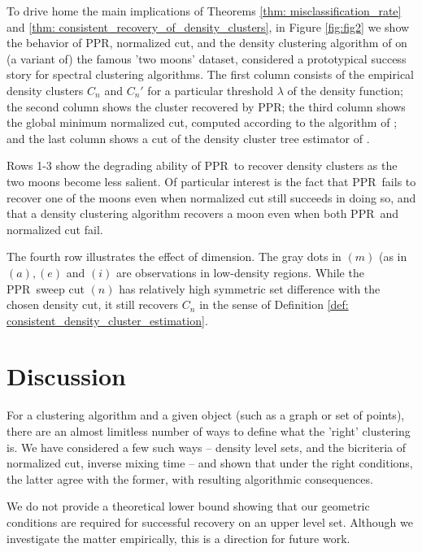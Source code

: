 \documentclass{article}
\newcommand{\1}{\mathbf{1}}
\newcommand{\ppr}{{\sc PPR}}
\newcommand{\pprspace}{{\sc PPR~}}
\theoremstyle{aldenthm}
\theoremstyle{aldenrmrk}
\begin{document}
To drive home the main implications of Theorems \ref{thm: misclassification_rate} and \ref{thm: consistent_recovery_of_density_clusters}, in Figure \ref{fig:fig2} we show the behavior of \ppr, normalized cut, and the density clustering algorithm of \citep{chaudhuri2010} on (a variant of) the famous 'two moons' dataset, considered a prototypical success story for spectral clustering algorithms. The first column consists of the empirical density clusters $C_n$ and $C_n'$ for a particular threshold $\lambda$ of the density function; the second column shows the cluster recovered by \ppr; the third column shows the global minimum normalized cut, computed according to the algorithm of \cite{szlam2010}; and the last column shows a cut of the density cluster tree estimator of \cite{chaudhuri2010}.

Rows 1-3 show the degrading ability of \pprspace to recover density clusters as the two moons become less salient. Of particular interest is the fact that \pprspace fails to recover one of the moons even when normalized cut still succeeds in doing so, and that a density clustering algorithm recovers a moon even when both \pprspace and normalized cut fail.

The fourth row illustrates the effect of dimension. The gray dots in $(m)$ (as in $(a), (e)$ and $(i)$ are observations in low-density regions. While the \pprspace sweep cut $(n)$ has relatively high symmetric set difference with the chosen density cut, it still recovers $C_n$ in the sense of Definition \ref{def: consistent_density_cluster_estimation}.


\section{Discussion}
\label{sec: discussion}
For a clustering algorithm and a given object (such as a graph or set of points), there are an almost limitless number of ways to define what the 'right' clustering is. We have considered a few such ways -- density level sets, and the bicriteria of normalized cut, inverse mixing time -- and shown that under the right conditions, the latter agree with the former, with resulting algorithmic consequences.

We do not provide a theoretical lower bound showing that our geometric conditions are required for successful recovery on an upper level set. Although we investigate the matter empirically, this is a direction for future work.

\clearpage



\end{document}
